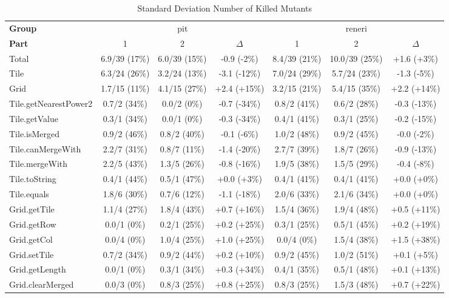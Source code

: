 \begin{sidewaystable}
\centering
\caption{Standard Deviation Number of Killed Mutants}
\label{tab:standard_deviation_number_of_killed_mutants}
\begin{tabular}{lcccccc}
\toprule
\textbf{Group} & \multicolumn{3}{c}{pit} & \multicolumn{3}{c}{reneri} \\
\textbf{Part} & 1 & 2 & $\Delta$ & 1 & 2 & $\Delta$ \\
\cmidrule(lr){1-1} \cmidrule(lr){2-4} \cmidrule(lr){5-7}
Total & 6.9/39 (17\%) & 6.0/39 (15\%) & -0.9 (-2\%) & 8.4/39 (21\%) & 10.0/39 (25\%) & +1.6 (+3\%) \\
\cmidrule(lr){1-1} \cmidrule(lr){2-4} \cmidrule(lr){5-7}
Tile & 6.3/24 (26\%) & 3.2/24 (13\%) & -3.1 (-12\%) & 7.0/24 (29\%) & 5.7/24 (23\%) & -1.3 (-5\%) \\
Grid & 1.7/15 (11\%) & 4.1/15 (27\%) & +2.4 (+15\%) & 3.2/15 (21\%) & 5.4/15 (35\%) & +2.2 (+14\%) \\
\cmidrule(lr){1-1} \cmidrule(lr){2-4} \cmidrule(lr){5-7}
Tile.getNearestPower2 & 0.7/2 (34\%) & 0.0/2 (0\%) & -0.7 (-34\%) & 0.8/2 (41\%) & 0.6/2 (28\%) & -0.3 (-13\%) \\
Tile.getValue & 0.3/1 (34\%) & 0.0/1 (0\%) & -0.3 (-34\%) & 0.4/1 (41\%) & 0.3/1 (25\%) & -0.2 (-15\%) \\
Tile.isMerged & 0.9/2 (46\%) & 0.8/2 (40\%) & -0.1 (-6\%) & 1.0/2 (48\%) & 0.9/2 (45\%) & -0.0 (-2\%) \\
Tile.canMergeWith & 2.2/7 (31\%) & 0.8/7 (11\%) & -1.4 (-20\%) & 2.7/7 (39\%) & 1.8/7 (26\%) & -0.9 (-13\%) \\
Tile.mergeWith & 2.2/5 (43\%) & 1.3/5 (26\%) & -0.8 (-16\%) & 1.9/5 (38\%) & 1.5/5 (29\%) & -0.4 (-8\%) \\
Tile.toString & 0.4/1 (44\%) & 0.5/1 (47\%) & +0.0 (+3\%) & 0.4/1 (41\%) & 0.4/1 (41\%) & +0.0 (+0\%) \\
Tile.equals & 1.8/6 (30\%) & 0.7/6 (12\%) & -1.1 (-18\%) & 2.0/6 (33\%) & 2.1/6 (34\%) & +0.0 (+0\%) \\
Grid.getTile & 1.1/4 (27\%) & 1.8/4 (43\%) & +0.7 (+16\%) & 1.5/4 (36\%) & 1.9/4 (48\%) & +0.5 (+11\%) \\
Grid.getRow & 0.0/1 (0\%) & 0.2/1 (25\%) & +0.2 (+25\%) & 0.3/1 (25\%) & 0.5/1 (45\%) & +0.2 (+19\%) \\
Grid.getCol & 0.0/4 (0\%) & 1.0/4 (25\%) & +1.0 (+25\%) & 0.0/4 (0\%) & 1.5/4 (38\%) & +1.5 (+38\%) \\
Grid.setTile & 0.7/2 (34\%) & 0.9/2 (44\%) & +0.2 (+10\%) & 0.9/2 (45\%) & 1.0/2 (51\%) & +0.1 (+5\%) \\
Grid.getLength & 0.0/1 (0\%) & 0.3/1 (34\%) & +0.3 (+34\%) & 0.4/1 (35\%) & 0.5/1 (48\%) & +0.1 (+13\%) \\
Grid.clearMerged & 0.0/3 (0\%) & 0.8/3 (25\%) & +0.8 (+25\%) & 0.8/3 (25\%) & 1.5/3 (48\%) & +0.7 (+22\%) \\
\bottomrule
\end{tabular}
\end{sidewaystable}
